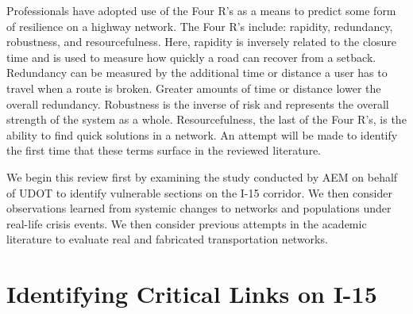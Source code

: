 Professionals have adopted use of the Four R’s as a means to predict some form of resilience on a
highway network. The Four R’s include: rapidity, redundancy, robustness, and resourcefulness.
Here, rapidity is inversely related to the closure time and is used to measure how quickly a road
can recover from a setback. Redundancy can be measured by the additional time or distance a user
has to travel when a route is broken. Greater amounts of time or distance lower the overall
redundancy. Robustness is the inverse of risk and represents the overall strength of the system
as a whole. Resourcefulness, the last of the Four R’s, is the ability to find quick solutions in
a network. An attempt will be made to identify the first time that these terms surface in the
reviewed literature.

We begin this review first by examining the study conducted by AEM on behalf of UDOT to identify
vulnerable sections on the I-15 corridor. We then consider observations learned from systemic 
changes to networks and populations under real-life crisis events. We then consider previous
attempts in the academic literature to evaluate real and fabricated transportation networks. 

\section{Identifying Critical Links on I-15}
